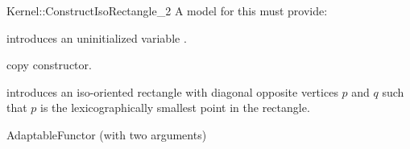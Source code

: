 \begin{ccRefFunctionObjectConcept}{Kernel::ConstructIsoRectangle_2}
A model for this must provide:



\ccHidden {}
             {introduces an uninitialized variable .}

\ccHidden {}
            {copy constructor.}

            {introduces an iso-oriented rectangle  with diagonal
             opposite vertices $p$ and $q$ such that $p$ is the
             lexicographically smallest point in the rectangle.}

\ccRefines
AdaptableFunctor (with two arguments)

\ccSeeAlso
{} \\

\end{ccRefFunctionObjectConcept}
